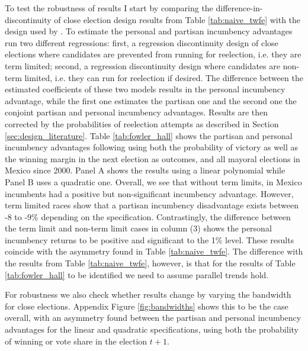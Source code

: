 \documentclass[12pt]{amsart}
\makeatletter
\def\subsection{\@startsection{subsection}{2}
	\z@{.8\linespacing\@plus.7\linespacing}{.7\linespacing}{\large}}
\numberwithin{equation}{section}
\theoremstyle{definition}
\theoremstyle{definition}
\theoremstyle{definition}
\makeatother
\begin{document}
    
\subsection{Robustness tests \label{sec:robustness}} 
  
To test the robustness of results I start by comparing the difference-in-discontinuity of close election design results from Table \ref{tab:naive_twfe} with the design used by \citet{fowler_hall_2014}. To estimate the personal and partisan incumbency advantages \citet{fowler_hall_2014} run two different regressions: first, a regression discontinuity design of close elections where candidates are prevented from running for reelection, i.e. they are term limited; second, a regression discontinuity design where candidates are non-term limited, i.e. they can run for reelection if desired. The difference between the estimated coefficients of these two models results in the personal incumbency advantage, while the first one estimates the partisan one and the second one the conjoint partisan and personal incumbency advantages. Results are then corrected by the probabilities of reelection attempts as described in Section \ref{sec:design_literature}. Table \ref{tab:fowler_hall} shows the partisan and personal incumbency advantages following \citet{fowler_hall_2014} using both the probability of victory as well as the winning margin in the next election as outcomes, and all mayoral elections in Mexico since 2000. Panel A shows the results using a linear polynomial while Panel B uses a quadratic one. Overall, we see that without term limits, in Mexico incumbents had a positive but non-significant incumbency advantage. However, term limited races show that a partisan incumbency disadvantage exists between -8 to -9\% depending on the specification. Contrastingly, the difference between the term limit and non-term limit cases in column (3) shows the personal incumbency returns to be positive and significant to the 1\% level. These results coincide with the asymmetry found in Table \ref{tab:naive_twfe}. The difference with the results from Table \ref{tab:naive_twfe}, however, is that for the results of Table \ref{tab:fowler_hall} to be identified we need to assume parallel trends hold.   

   


For robustness we also check whether results change by varying the bandwidth for close elections. Appendix Figure \ref{fig:bandwidths} shows this to be the case overall, with an asymmetry found between the partisan and personal incumbency advantages for the linear and quadratic specifications, using both the probability of winning or vote share in the election $t+1$.       
\end{document}
